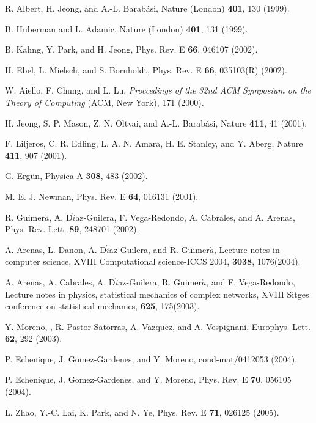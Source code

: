 \documentclass[aps,prl,twocolumn,superscriptaddress,showpacs]{revtex4}
\begin{document}
\begin{references}
R. Albert, H. Jeong, and A.-L. Barab\'{a}si, Nature (London) {\bf 401},
130 (1999).

B. Huberman and L. Adamic, Nature (London) {\bf 401}, 131 (1999).

B. Kahng, Y. Park, and H. Jeong,
Phys. Rev. E {\bf 66}, 046107 (2002).

H. Ebel, L. Mielsch, and S. Bornholdt,
Phys. Rev. E {\bf 66}, 035103(R) (2002).

W. Aiello, F. Chung, and L. Lu, {\it Proccedings of the 32nd ACM Symposium
on the Theory of Computing} (ACM, New York), 171 (2000).

H. Jeong, S. P. Mason, Z. N. Oltvai, and A.-L. Barab\'{a}si,
Nature {\bf 411}, 41 (2001).

F. Liljeros, C. R. Edling, L. A. N. Amara, H. E. Stanley, and Y. Aberg,
Nature {\bf 411}, 907 (2001).

G. Erg\"{u}n, Physica A {\bf 308}, 483 (2002).

M. E. J. Newman, Phys. Rev. E {\bf 64}, 016131 (2001).

R. Guimer$\acute{a}$, A. D$\acute{i}$az-Guilera, F. Vega-Redondo,
A. Cabrales, and A. Arenas, Phys. Rev. Lett. {\bf 89}, 248701
(2002).

A. Arenas, L. Danon, A. D$\acute{i}$az-Guilera, and R.
Guimer$\acute{a}$, Lecture notes in computer science, XVIII
Computational science-ICCS 2004, {\bf 3038}, 1076(2004).

A. Arenas, A. Cabrales, A. D$\acute{i}$az-Guilera, R.
Guimer$\acute{a}$, and F. Vega-Redondo, Lecture notes in physics,
statistical mechanics of complex networks, XVIII Sitges conference
on statistical mechanics, {\bf 625}, 175(2003).

Y. Moreno, , R. Pastor-Satorras, A. Vazquez, and A. Vespignani,
Europhys. Lett. {\bf 62}, 292 (2003).

P. Echenique, J. Gomez-Gardenes, and Y. Moreno, cond-mat/0412053
(2004).

P. Echenique, J. Gomez-Gardenes, and Y. Moreno, Phys. Rev. E {\bf
70}, 056105 (2004).

L. Zhao, Y.-C. Lai, K. Park, and N. Ye, Phys. Rev. E {\bf 71},
026125 (2005).


\end{references}
\end{document}
